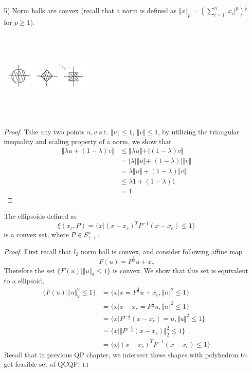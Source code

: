 5) Norm balls are convex (recall that a norm is defined as $\Vert  x\Vert_p = (\sum^n_{i=1}\vert  x_i\vert^p)^{\frac{1}{p}}$ for $p\geq 1$).

\begin{marginfigure}
	\centering
	\includegraphics[width=1.8in,height=1.8in]{figures/ch08/figure1023_6.png}
\end{marginfigure}

\begin{proof}
	Take any two points $u,v$ s.t. $\Vert u\Vert \leq 1$, $\Vert v\Vert \leq 1$, by utilizing the triangular inequality and scaling property of a norm, we show that
	\begin{align*}
	\Vert \lambda u+(1-\lambda)v\Vert &\leq \Vert \lambda u\Vert + \Vert (1-\lambda)v\Vert\\
	&= \vert \lambda \vert \Vert  u\Vert + \vert (1-\lambda) \vert \Vert  v\Vert\\
	&= \lambda\Vert  u\Vert + (1-\lambda)\Vert  v\Vert\\
	&\leq \lambda 1 + (1-\lambda)1\\
	&= 1
	\end{align*}
\end{proof}

\begin{example}
The ellipsoids defined as
\begin{equation*}
\xi(x_c, P) =\{x|(x - x_c)^TP^{-1}(x - x_c) \leq 1 \}
\end{equation*}
is a convex set, where $P\in S^n_{++}$.

\begin{proof}
	First recall that $l_2$ norm ball is convex, and consider following affine map
	$$F(u) = P^{\frac{1}{2}}u + x_c$$
	Therefore the set $\{F(u) | \Vert u\Vert_2 \leq 1 \}$ is convex. We show that this set is equivalent to a ellipsoid,
\begin{align*}
\{F(u) | \Vert u\Vert^2_2 \leq 1 \} &= \{x|x = P^{\frac{1}{2}}u+x_c, \Vert u\Vert^2 \leq 1 \}\\
&= \{x|x - x_c = P^{\frac{1}{2}}u, \Vert u\Vert^2 \leq 1 \}\\
&= \{x|P^{-\frac{1}{2}}(x - x_c) =u, \Vert u\Vert^2 \leq 1 \}\\
&= \{x|\Vert P^{-\frac{1}{2}}(x - x_c)\Vert^2_2 \leq 1 \}\\
&= \{x|(x - x_c)^TP^{-1}(x - x_c) \leq 1 \}
\end{align*}
Recall that in previous QP chapter, we intersect these shapes with polyhedron to get feasible set of QCQP.
\end{proof}
\end{example}

